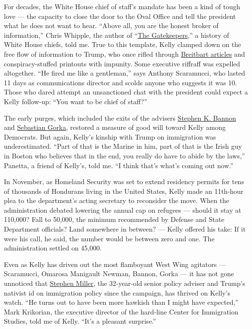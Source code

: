 For decades, the White House chief of staff's mandate has been a kind of
tough love --- the capacity to close the door to the Oval Office and
tell the president what he does not want to hear. ``Above all, you are
the honest broker of information,'' Chris Whipple, the author of
``\href{https://www.nytimes3xbfgragh.onion/2017/03/24/books/review/the-head-honchos-head-honcho.html}{The
Gatekeepers},'' a history of White House chiefs, told me. True to this
template, Kelly clamped down on the free flow of information to Trump,
who once rifled through
\href{https://www.nytimes3xbfgragh.onion/2017/03/04/us/politics/trump-obama-tap-phones.html}{Breitbart
articles} and conspiracy-stuffed printouts with impunity. Some executive
riffraff was expelled altogether. ``He fired me like a gentleman,'' says
Anthony Scaramucci, who lasted 11 days as communications director and
scolds anyone who suggests it was 10. Those who dared attempt an
unsanctioned chat with the president could expect a Kelly follow-up:
``You want to be chief of staff?''

The early purges, which included the exits of the advisers
\href{https://www.nytimes3xbfgragh.onion/2017/08/18/us/politics/steve-bannon-trump-white-house.html}{Stephen
K. Bannon} and
\href{https://www.nytimes3xbfgragh.onion/2017/08/25/us/politics/sebastian-gorka-leaves-white-house.html}{Sebastian
Gorka}, restored a measure of good will toward Kelly among Democrats.
But again, Kelly's kinship with Trump on immigration was underestimated.
``Part of that is the Marine in him, part of that is the Irish guy in
Boston who believes that in the end, you really do have to abide by the
laws,'' Panetta, a friend of Kelly's, told me. ``I think that's what's
coming out now.''

In November, as Homeland Security was set to extend residency permits
for tens of thousands of Hondurans living in the United States, Kelly
made an 11th-hour plea to the department's acting secretary to
reconsider the move. When the administration debated lowering the annual
cap on refugees --- should it stay at 110,000? Fall to 50,000, the
minimum recommended by Defense and State Department officials? Land
somewhere in between? --- Kelly offered his take: If it were his call,
he said, the number would be between zero and one. The administration
settled on 45,000.

Even as Kelly has driven out the most flamboyant West Wing agitators ---
Scaramucci, Omarosa Manigault Newman, Bannon, Gorka --- it has not gone
unnoticed that
\href{https://www.nytimes3xbfgragh.onion/2017/10/09/us/politics/stephen-miller-trump-white-house.html}{Stephen
Miller}, the 32-year-old senior policy adviser and Trump's nativist id
on immigration policy since the campaign, has thrived on Kelly's watch.
``He turns out to have been more hawkish than I might have expected,''
Mark Krikorian, the executive director of the hard-line Center for
Immigration Studies, told me of Kelly. ``It's a pleasant surprise.''

